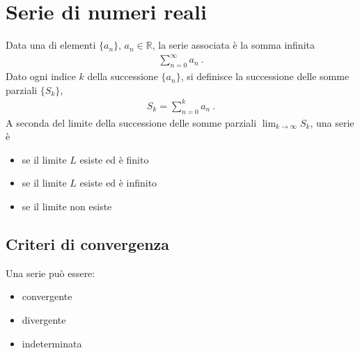 \documentclass[letterpaper,10pt,italian]{jupyterBook}
\begin{document}
\section{Serie di numeri reali}
\label{\detokenize{ch/series:serie-di-numeri-reali}}\label{\detokenize{ch/series:math-hs-series-real-series}}
\sphinxAtStartPar
{} Data una  di elementi \(\{ a_n \}\), \(a_n \in \mathbb{R}\), la serie associata è la somma infinita
\begin{equation*}
\begin{split}\sum_{n=0}^{\infty} a_n \ .\end{split}
\end{equation*}
\sphinxAtStartPar
Dato ogni indice \(k\) della successione \(\{ a_n \}\), si definisce la successione delle somme parziali \(\{ S_k \}\),
\begin{equation*}
\begin{split}S_k = \sum_{n=0}^{k} a_n \ .\end{split}
\end{equation*}
\sphinxAtStartPar
{}
A seconda del limite della successione delle somme parziali \(\lim_{k \rightarrow \infty} S_k\), una serie è
\begin{itemize}
\item {} 
\sphinxAtStartPar
{} se il limite \(L\) esiste ed è finito

\item {} 
\sphinxAtStartPar
{} se il limite \(L\) esiste ed è infinito

\item {} 
\sphinxAtStartPar
{} se il limite non esiste

\end{itemize}


\subsection{Criteri di convergenza}
\label{\detokenize{ch/series:id1}}
\sphinxAtStartPar
Una serie può essere:
\begin{itemize}
\item {} 
\sphinxAtStartPar
convergente

\item {} 
\sphinxAtStartPar
divergente

\item {} 
\sphinxAtStartPar
indeterminata

\end{itemize}
\end{document}
